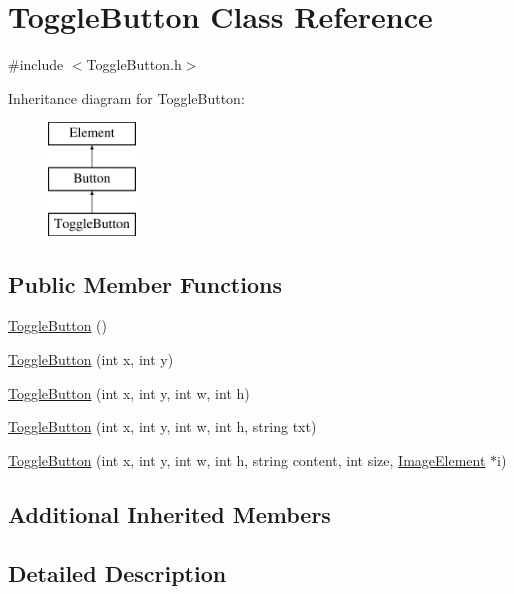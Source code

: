 \hypertarget{class_toggle_button}{\section{Toggle\-Button Class Reference}
\label{class_toggle_button}
}


{\ttfamily \#include $<$Toggle\-Button.\-h$>$}

Inheritance diagram for Toggle\-Button\-:\begin{figure}[H]
\begin{center}
\leavevmode
\includegraphics[height=3.000000cm]{class_toggle_button}
\end{center}
\end{figure}
\subsection*{Public Member Functions}
\begin{DoxyCompactItemize}
\item 
\hyperlink{class_toggle_button_aa978ecd118f11987b5a8060072b407f0}{Toggle\-Button} ()
\item 
\hyperlink{class_toggle_button_aef2a0abd79b023f9a4bcb5b53fc5be59}{Toggle\-Button} (int x, int y)
\item 
\hyperlink{class_toggle_button_a1217ac37ca79450eeaf8a8a7cd79e690}{Toggle\-Button} (int x, int y, int w, int h)
\item 
\hyperlink{class_toggle_button_a7ae1419f6fe7bc72af6e972c490f3d3c}{Toggle\-Button} (int x, int y, int w, int h, string txt)
\item 
\hyperlink{class_toggle_button_adf501f89389fb0297e5b1b9ceaf1abdc}{Toggle\-Button} (int x, int y, int w, int h, string content, int size, \hyperlink{class_image_element}{Image\-Element} $\ast$i)
\end{DoxyCompactItemize}
\subsection*{Additional Inherited Members}


\subsection{Detailed Description}


